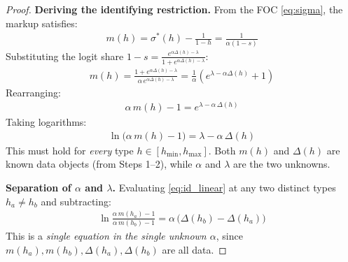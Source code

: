 \documentclass[12pt]{article}
\theoremstyle{plain}
\theoremstyle{plain}
\theoremstyle{definition}  %
\theoremstyle{remark}  %
\begin{document}
\begin{proof}
\textbf{Deriving the identifying restriction.} From the FOC \eqref{eq:sigma}, the markup satisfies:
\begin{align*}
    m(h) = \sigma^*(h) - \frac{1}{1-h} = \frac{1}{\alpha(1-s)}
\end{align*}
Substituting the logit share $1-s = \frac{e^{\alpha\Delta(h)-\lambda}}{1+e^{\alpha\Delta(h)-\lambda}}$:
\begin{align*}
    m(h) = \frac{1+e^{\alpha\Delta(h)-\lambda}}{\alpha\, e^{\alpha\Delta(h)-\lambda}} = \frac{1}{\alpha}\left(e^{\lambda - \alpha\Delta(h)} + 1\right)
\end{align*}
Rearranging:
\begin{align}\label{eq:id_restriction}
    \alpha\, m(h) - 1 = e^{\lambda - \alpha\,\Delta(h)}
\end{align}
Taking logarithms:
\begin{align}\label{eq:id_linear}
    \boxed{\;\ln\!\big(\alpha\, m(h) - 1\big) = \lambda - \alpha\, \Delta(h)\;}
\end{align}
This must hold for \emph{every} type $h \in [h_{\min}, h_{\max}]$. Both $m(h)$ and $\Delta(h)$ are known data objects (from Steps 1--2), while $\alpha$ and $\lambda$ are the two unknowns.

\medskip\noindent
\textbf{Separation of $\alpha$ and $\lambda$.} Evaluating \eqref{eq:id_linear} at any two distinct types $h_a \neq h_b$ and subtracting:
\begin{align}\label{eq:alpha_id}
    \ln\frac{\alpha\, m(h_a) - 1}{\alpha\, m(h_b) - 1} = \alpha\,\big(\Delta(h_b) - \Delta(h_a)\big)
\end{align}
This is a \emph{single equation in the single unknown $\alpha$}, since $m(h_a), m(h_b), \Delta(h_a), \Delta(h_b)$ are all data.


\end{proof}
\end{document}
